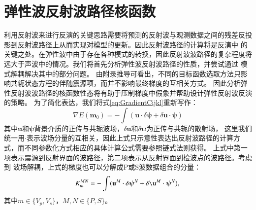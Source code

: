 \section{弹性波反射波路径核函数}
利用反射波来进行反演的关键思路需要将预测的反射波与观测数据之间的残差反投影到反射波路径上从而实现对模型的更新。因此反射波路径的计算将是反演中
的关键之处。在弹性波中由于存在各种模式的转换，因此反射波波路径的复杂程度将远大于声波中的情况。我们将首先分析弹性波反射波路径的性质，并尝试通过
模式解耦解决其中的部分问题。
由附录推导可看出，不同的目标函数选取方法只影响共轭状态方程的伴随震源项，而并不影响最终梯度的互相关方式。
因此分析弹性反射波波路径的核函数性态将有助于压制梯度中假象并帮助设计弹性反射波反演的策略。
为了简化表达，我们将式\ref{eq:GradientCijkl}重新写作：
\begin{equation}
    \nabla E(
    \mathbf{m}_0)=-\int(
    \mathbf{u}\cdot\delta \boldsymbol{\psi}
    +\delta
    \mathbf{u}\cdot{\boldsymbol{\psi}})
    \label{eq:kernelgradient} 
\end{equation} 
其中$\mathbf{u}$和$\boldsymbol{\psi}$背景介质的正传与共轭波场，$\delta\mathbf{u}$和$\delta \boldsymbol{\psi}$为正传与共轭的散射场，
这里我们统一用$\cdot$表示波场分量的互相关，因此上式只示意性表达出反射波路径的计算方式，而不同参数化方式相应的具体计算公式需要参照链式法则获得。
上式中第一项表示震源到反射界面的波路径，第二项表示从反射界面到检波点的波路径。考虑到
波场解耦，上式的梯度也可以分解成P或S波数据组合的分量：
\begin{equation}
    K_m^{MN}     
    =-\int(\mathbf{u}^M\cdot\delta \boldsymbol{\psi}^N
    +\delta
    \mathbf{\u}^M\cdot\boldsymbol{\psi}^N),\\
    \label{eq:decompkernel} 
\end{equation}
其中$m\in\{V_p, V_s\}$，$M,N\in\{P,S\}$。
